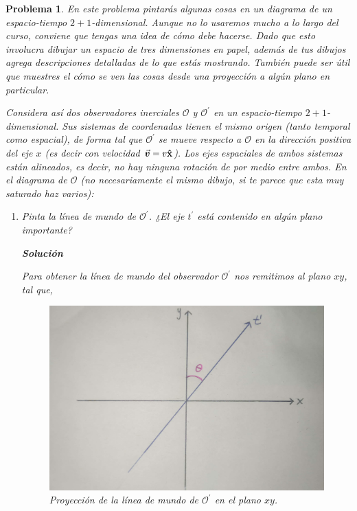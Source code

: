 \documentclass[12pt]{article}
\theoremstyle{break}
\newtheorem{exercise}{Problema}
\theoremstyle{nonumberbreak}
\DeclareRobustCommand{\uvec}[1]{{%
  \ifcsname uvec#1\endcsname
     \csname uvec#1\endcsname
   \else
    \bm{\hat{\mathbf{#1}}}%
   \fi
}}%
\newcommand*{\observer}{\mathcal{O}}
\newcommand*{\primeobserver}{\mathcal{O}^{\prime}}
\newcommand*{\inlinesol}{\vspace*{10pt}\textbf{Solución}\vspace*{10pt}}
\begin{document}
    \pagebreak
    \begin{exercise}
        En este problema pintarás algunas cosas en un diagrama de un espacio-tiempo \(2 + 1\)-dimensional. Aunque no lo usaremos mucho a lo largo del curso, conviene que tengas una idea de cómo debe hacerse. Dado que esto involucra dibujar un espacio de tres dimensiones en papel, además de tus dibujos agrega descripciones detalladas de lo que estás mostrando. También puede ser útil que muestres el cómo se ven las cosas desde una proyección a algún plano en particular.

        Considera así dos observadores inerciales \(\observer\) y \(\primeobserver\) en un espacio-tiempo \(2 + 1\)-dimensional. Sus sistemas de coordenadas tienen el mismo origen (tanto temporal como espacial), de forma tal que \(\primeobserver\) se mueve respecto a \(\observer\) en la dirección positiva del eje \(x\) (es decir con velocidad \(\va*{v} = v\uvec{x}\)). Los ejes espaciales de ambos sistemas están alineados, es decir, no hay ninguna rotación de por medio entre ambos. En el diagrama de \(\observer\) (no necesariamente el mismo dibujo, si te parece que esta muy saturado haz varios):

        \begin{enumerate}[label = \alph*)]
            \item Pinta la línea de mundo de \(\primeobserver\). ¿El eje \(t^{\prime}\) está contenido en algún plano importante?
            
            \inlinesol

            Para obtener la línea de mundo del observador \(\primeobserver\) nos remitimos al plano \(xy\), tal que,

            \begin{figure}[htb]
                \centering
                \includegraphics[scale = 0.18]{fig-5}
                \caption{Proyección de la línea de mundo de \(\primeobserver\) en el plano \(xy\).}
                \label{eq:Oprime-Planexy}
            \end{figure}


\end{enumerate}
\end{exercise}
\end{document}

